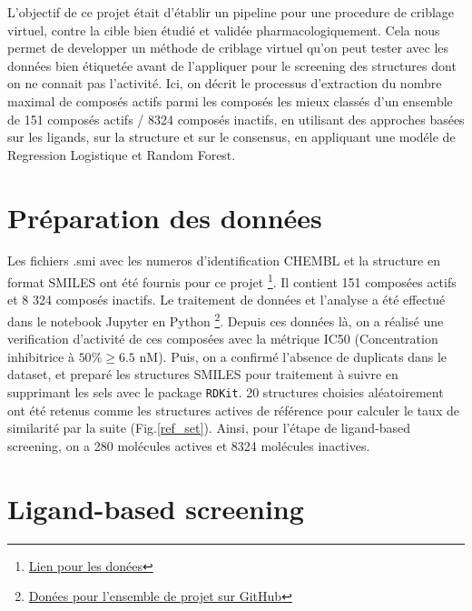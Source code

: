 \documentclass{isddmaster}
\begin{document}
	L'objectif de ce projet était d'établir un pipeline pour une procedure de criblage virtuel, contre la cible bien étudié et validée pharmacologiquement.
	Cela nous permet de developper un méthode de criblage virtuel qu'on peut tester avec les données bien étiquetée avant de l'appliquer pour le screening des structures dont on ne connait pas l'activité.
	Ici, on décrit le processus d'extraction du nombre maximal de composés actifs parmi les composés les mieux classés d'un ensemble de 151 composés actifs / 8324 composés inactifs, en utilisant des approches basées sur les ligands, sur la structure et sur le consensus, en appliquant une modéle de Regression Logistique et Random Forest.
	
	
	
	\section{Préparation des données}
	Les fichiers .smi avec les numeros d'identification CHEMBL et la structure en format SMILES ont été fournis pour ce projet \footnote{\href{https://owncloud.rpbs.univ-paris-diderot.fr/owncloud/index.php/s/J3z2UQGxRhSr5YY}{Lien pour les donées}}. Il contient 151 composées actifs et 8 324 composés inactifs.
	Le traitement de données et l'analyse a été effectué dans le notebook Jupyter en Python \footnote{\href{https://github.com/annhater/My-Vault}{Donées pour l'ensemble de projet sur GitHub}}.
	Depuis ces données là, on a réalisé une verification d'activité de ces composées avec la métrique IC50 (Concentration inhibitrice à $50\% \geq 6.5$ nM). Puis, on a confirmé l'absence de duplicats dans le dataset, et preparé les structures SMILES pour traitement à suivre en supprimant les sels avec le package \lstinline{RDKit}.
	20 structures choisies aléatoirement ont été retenus comme les structures actives de référence pour calculer le taux de similarité par la suite (Fig.\ref{ref_set}). Ainsi, pour l'étape de ligand-based screening, on a 280 molécules actives et 8324 molécules inactives.


	\section{Ligand-based screening}
	
\end{document}
